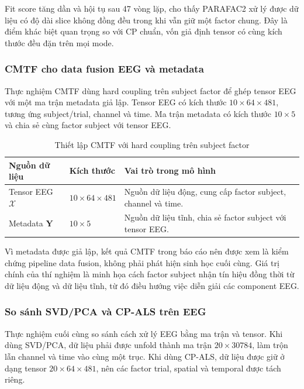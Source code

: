 Fit score tăng dần và hội tụ sau 47 vòng lặp, cho thấy PARAFAC2 xử lý được dữ
liệu có độ dài slice không đồng đều trong khi vẫn giữ một factor chung. Đây là
điểm khác biệt quan trọng so với CP chuẩn, vốn giả định tensor có cùng kích thước
đều đặn trên mọi mode.

\subsubsection{CMTF cho data fusion EEG và metadata}

Thực nghiệm CMTF dùng hard coupling trên subject factor để ghép tensor EEG với
một ma trận metadata giả lập. Tensor EEG có kích thước $10 \times 64 \times
481$, tương ứng subject/trial, channel và time. Ma trận metadata có kích thước
$10 \times 5$ và chia sẻ cùng factor subject với tensor EEG.

\begin{table}[H]
\centering
\caption{Thiết lập CMTF với hard coupling trên subject factor}
\label{tab:exp-dm-cmtf-setup}
\renewcommand{\arraystretch}{1.2}
\begin{tabular}{L{0.24\textwidth}C{0.24\textwidth}L{0.36\textwidth}}
\toprule
\textbf{Nguồn dữ liệu} & \textbf{Kích thước} & \textbf{Vai trò trong mô hình} \\
\midrule
Tensor EEG $\mathcal{X}$ & $10 \times 64 \times 481$ & Nguồn dữ liệu động, cung cấp factor subject, channel và time. \\
Metadata $\mathbf{Y}$ & $10 \times 5$ & Nguồn dữ liệu tĩnh, chia sẻ factor subject với tensor EEG. \\
\bottomrule
\end{tabular}
\end{table}

Vì metadata được giả lập, kết quả CMTF trong báo cáo nên được xem là kiểm chứng
pipeline data fusion, không phải phát hiện sinh học cuối cùng. Giá trị chính của
thí nghiệm là minh họa cách factor subject nhận tín hiệu đồng thời từ dữ liệu
động và dữ liệu tĩnh, từ đó điều hướng việc diễn giải các component EEG.

\subsubsection{So sánh SVD/PCA và CP-ALS trên EEG}

Thực nghiệm cuối cùng so sánh cách xử lý EEG bằng ma trận và tensor. Khi dùng
SVD/PCA, dữ liệu phải được unfold thành ma trận $20 \times 30784$, làm trộn lẫn
channel và time vào cùng một trục. Khi dùng CP-ALS, dữ liệu được giữ ở dạng
tensor $20 \times 64 \times 481$, nên các factor trial, spatial và temporal được
tách riêng.


